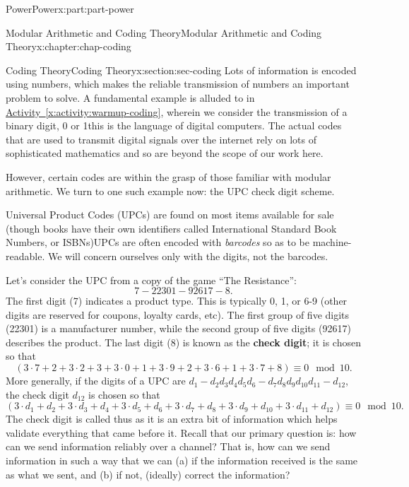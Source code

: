 \documentclass[oneside,10pt,]{book}
\newcommand{\xreffont}{\relax}
\newcommand{\terminology}[1]{\textbf{#1}}
\numberwithin{equation}{section}
\begin{document}
\begin{partptx}{Power}{}{Power}{}{}{x:part:part-power}
\begin{chapterptx}{Modular Arithmetic and Coding Theory}{}{Modular Arithmetic and Coding Theory}{}{}{x:chapter:chap-coding}
\begin{sectionptx}{Coding Theory}{}{Coding Theory}{}{}{x:section:sec-coding}
Lots of information is encoded using numbers, which makes the reliable transmission of numbers an important problem to solve. A fundamental example is alluded to in \hyperref[x:activity:warmup-coding]{Activity~{\xreffont\ref{x:activity:warmup-coding}}}, wherein we consider the transmission of a binary digit, 0 or 1\textemdash{}this is the language of digital computers. The actual codes that are used to transmit digital signals over the internet rely on lots of sophisticated mathematics and so are beyond the scope of our work here.%
\par
However, certain codes are within the grasp of those familiar with modular arithmetic. We turn to one such example now: the UPC check digit scheme.%
\par
Universal Product Codes (UPCs) are found on most items available for sale (though books have their own identifiers called International Standard Book Numbers, or ISBNs)UPCs are often encoded with \emph{barcodes} so as to be machine-readable. We will concern ourselves only with the digits, not the barcodes.%
\par
Let's consider the UPC from a copy of the game ``The Resistance'':%
%
\begin{equation*}
7-22301-92617-8.
\end{equation*}
The first digit (7) indicates a product type. This is typically 0, 1, or 6-9 (other digits are reserved for coupons, loyalty cards, etc). The first group of five digits (22301) is a manufacturer number, while the second group of five digits (92617) describes the product. The last digit (8) is known as the \terminology{check digit}; it is chosen so that%
%
\begin{equation*}
(3\cdot 7 + 2 + 3\cdot 2 + 3 + 3\cdot 0 + 1 + 3\cdot 9 + 2 + 3\cdot 6 + 1 + 3\cdot 7 + 8)\equiv 0\mod 10.
\end{equation*}
More generally, if the digits of a UPC are \(d_1 - d_2 d_3 d_4 d_5 d_6 - d_7 d_8 d_9 d_{10} d_{11} - d_{12}\), the check digit \(d_{12}\) is chosen so that%
%
\begin{equation*}
(3\cdot d_1 + d_2 + 3\cdot d_3 + d_4 + 3\cdot d_5 + d_6 + 3\cdot d_7 + d_8 + 3\cdot d_9 + d_{10} + 3\cdot d_{11} + d_{12})\equiv 0\mod 10.
\end{equation*}
The check digit is called thus as it is an extra bit of information which helps validate everything that came before it. Recall that our primary question is: how can we send information reliably over a channel? That is, how can we send information in such a way that we can (a) if the information received is the same as what we sent, and (b) if not, (ideally) correct the information?%

\end{sectionptx}
\end{chapterptx}
\end{partptx}
\end{document}

